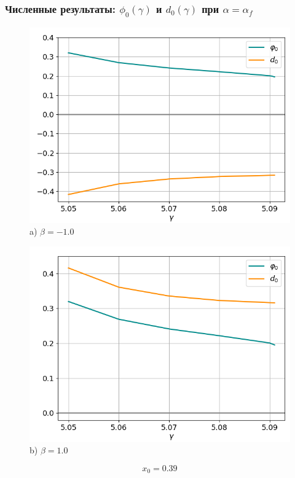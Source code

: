 \documentclass[fullscreen=true, unicode, bookmarks=false]{beamer}
\begin{document}
\begin{frame}
\frametitle{ Численные результаты: $ \phi_0(\gamma) $ и $ d_0(\gamma) $ при $ \alpha=\alpha_f $ }

\begin{figure} 
\begin{minipage}[h]{0.49\linewidth}
\begin{center}
\includegraphics[scale=0.33]{oscillating_phi0d0_after_tangent_x0_039_beta_-1.png} \\ {\scriptsize a) $ \beta = -1.0 $}
\end{center}
\end{minipage} 
\hfill
\begin{minipage}[h]{0.49\linewidth}
\begin{center}
\includegraphics[scale=0.33]{oscillating_phi0d0_after_tangent_x0_039_beta_1.png}  \\ {\scriptsize b) $ \beta = 1.0 $}
\end{center}
\end{minipage} 
\end{figure}

$$ x_0 = 0.39 $$

\end{frame}
\end{document}
